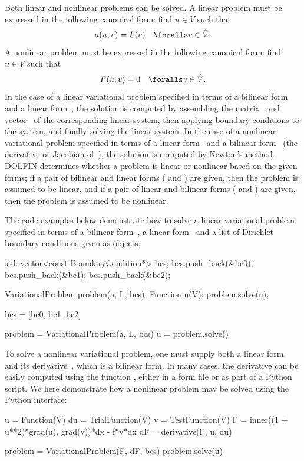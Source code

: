 Both linear and nonlinear problems can be solved. A linear problem
must be expressed in the following canonical form: find $u \in V$ such
that
\begin{equation}
  a(u, v) = L(v) \quad \foralls v \in \hat{V}.
\end{equation}
A nonlinear problem must be expressed in the following canonical form:
find $u \in V$ such that
\begin{equation}
  F(u; v) = 0 \quad \foralls v \in \hat{V}.
\end{equation}
In the case of a linear variational problem specified in terms of a
bilinear form~ and a linear form~, the solution is
computed by assembling the matrix~ and vector~ of the
corresponding linear system, then applying boundary conditions to the
system, and finally solving the linear system. In the case of a
nonlinear variational problem specified in terms of a linear
form~ and a bilinear form~ (the derivative or Jacobian
of~), the solution is computed by Newton's method. DOLFIN
determines whether a problem is linear or nonlinear based on the given
forms; if a pair of bilinear and linear forms ( and )
are given, then the problem is assumed to be linear, and if a pair of
linear and bilinear forms ( and ) are given, then the
problem is assumed to be nonlinear.

The code examples below demonstrate how to solve a linear variational
problem specified in terms of a bilinear form~, a linear
form~ and a list of Dirichlet boundary conditions given as
 objects:
\begin{c++}
std::vector<const BoundaryCondition*> bcs;
bcs.push_back(&bc0);
bcs.push_back(&bc1);
bcs.push_back(&bc2);

VariationalProblem problem(a, L, bcs);
Function u(V);
problem.solve(u);
\end{c++}
\begin{python}
bcs = [bc0, bc1, bc2]

problem = VariationalProblem(a, L, bcs)
u = problem.solve()
\end{python}

To solve a nonlinear variational problem, one must supply both a linear
form~ and its derivative~, which is a bilinear form. In
many cases, the derivative can be easily computed using the function
, either in a  form file or as part of a Python
script. We here demonstrate how a nonlinear problem may be solved using
the Python interface:
\begin{python}
u  = Function(V)
du = TrialFunction(V)
v  = TestFunction(V)
F  = inner((1 + u**2)*grad(u), grad(v))*dx - f*v*dx
dF = derivative(F, u, du)

problem = VariationalProblem(F, dF, bcs)
problem.solve(u)
\end{python}

